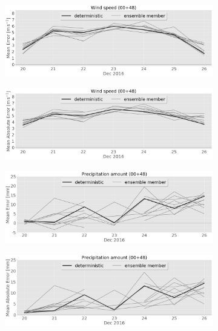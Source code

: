 \begin{figure}\ContinuedFloat
	\centering
	\begin{subfigure}[b]{0.49\textwidth}
		\includegraphics[width=\textwidth]{./fig_sfc_ws/ME_20161220_26_00}
		\caption{}\label{fig:bias:ws}
	\end{subfigure}
	\begin{subfigure}[b]{0.49\textwidth}
		\includegraphics[width=\textwidth]{./fig_sfc_ws/MAE_20161220_26_00}
		\caption{}\label{fig:MAE:ws}
	\end{subfigure}
	\begin{subfigure}[b]{0.49\textwidth}
		\includegraphics[width=\textwidth]{./fig_sfc_precip/ME_20161220_26_00}
		\caption{}\label{fig:bias:precip}
	\end{subfigure}
	\begin{subfigure}[b]{0.49\textwidth}
		\includegraphics[width=\textwidth]{./fig_sfc_precip/MAE_20161220_26_00}

\end{subfigure}
\end{figure}
